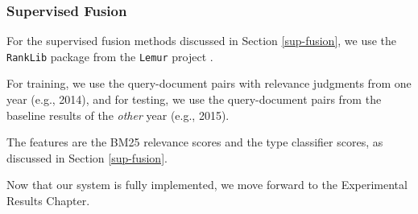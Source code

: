\subsubsection{Supervised Fusion}\label{impl-sup}
For the supervised fusion methods discussed in Section \ref{sup-fusion},
we use the \texttt{RankLib} package from the \texttt{Lemur} project \cite{ranklib}.

For training, we use the query-document pairs with relevance judgments from one year (e.g., 2014),
and for testing, we use the query-document pairs from the baseline results of the \emph{other} year (e.g., 2015).

The features are the BM25 relevance scores and the type classifier scores, as discussed in Section \ref{sup-fusion}.

Now that our system is fully implemented, we move forward to the Experimental Results Chapter.




